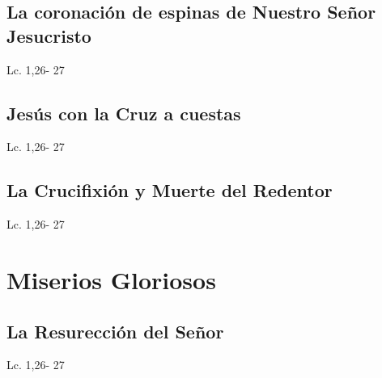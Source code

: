 \documentclass[a4paper,11pt,sans]{article}
\begin{document}
    \subsection*{\hfil La coronación de espinas de Nuestro Señor Jesucristo \hfil}
      \begin{multicols}{2}

      \columnbreak
           
      \end{multicols}
      \begin{center}
         Lc. 1,26- 27           
      \end{center}
    \subsection*{\hfil Jesús con la Cruz a cuestas \hfil}
      \begin{multicols}{2}

      \columnbreak
           
      \end{multicols}
      \begin{center}
        Lc. 1,26- 27           
      \end{center}
    \subsection*{\hfil La Crucifixión y Muerte del Redentor \hfil}
      \begin{multicols}{2}

      \columnbreak
           
      \end{multicols}
      \begin{center}
         Lc. 1,26- 27           
      \end{center}
         
    \newpage
         
  \section*{\hfil Miserios Gloriosos \hfil}
    \subsection*{\hfil La Resurección del Señor \hfil}
      \begin{multicols}{2}

      \columnbreak
                           
      \end{multicols}
      \begin{center}
        Lc. 1,26- 27           
      \end{center}
\end{document}
